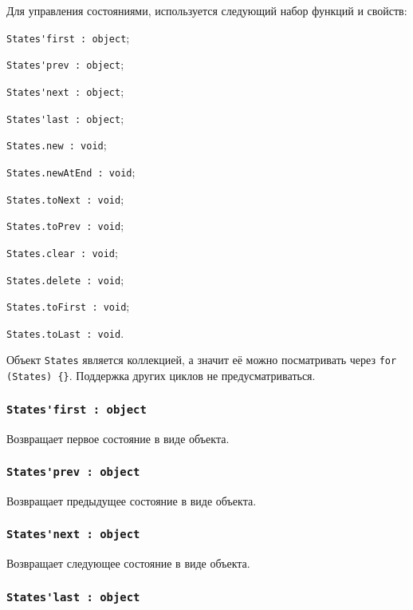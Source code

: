 Для управления состояниями, используется следующий набор функций и свойств:
\begin{icItems}
	\item \lstinline|States'first : object|;
	\item \lstinline|States'prev : object|;
	\item \lstinline|States'next : object|;
	\item \lstinline|States'last : object|;
	\item \lstinline|States.new : void|;
	\item \lstinline|States.newAtEnd : void|;
	\item \lstinline|States.toNext : void|;
	\item \lstinline|States.toPrev : void|;
	\item \lstinline|States.clear : void|;
	\item \lstinline|States.delete : void|;
	\item \lstinline|States.toFirst : void|;
	\item \lstinline|States.toLast : void|.
\end{icItems}

Объект \lstinline|States| является коллекцией, а значит её можно посматривать через \lstinline|for (States) {}|. Поддержка других циклов не предусматриваться.

\subsubsection{\lstinline|States'first : object|}

Возвращает первое состояние в виде объекта.

\subsubsection{\lstinline|States'prev : object|}

Возвращает предыдущее состояние в виде объекта.

\subsubsection{\lstinline|States'next : object|}

Возвращает следующее состояние в виде объекта.

\subsubsection{\lstinline|States'last : object|}

